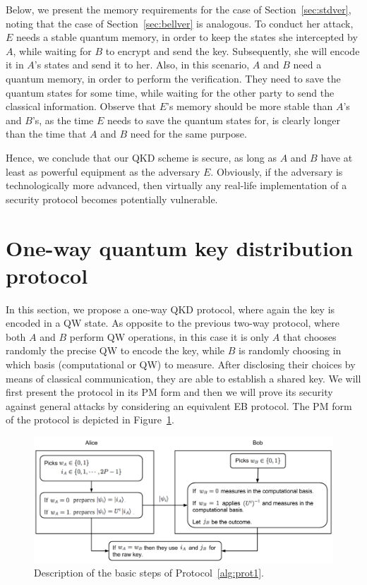 Below, we present the memory requirements for the case of Section~\ref{sec:stdver}, noting that the case of Section~\ref{sec:bellver} is analogous. To conduct her attack, $E$ needs a stable quantum memory, in order to keep the states she intercepted by $A$, while waiting for $B$ to encrypt and send the key. Subsequently, she will encode it in $A$'s states and send it to her. Also, in this scenario, $A$ and $B$ need a quantum memory, in order to perform the verification. They need to save the quantum states for some time, while waiting for the other party to send the classical information. Observe that $E$'s memory should be more stable than $A$'s and $B$'s, as the time $E$ needs to save the quantum states for, is clearly longer than the time that $A$ and $B$ need for the same purpose.

Hence, we conclude that our QKD scheme is  secure, as long as $A$ and $B$ have at least as powerful equipment as the adversary $E$. Obviously, if the adversary is technologically more advanced, then virtually any real-life implementation of a security protocol becomes potentially vulnerable.

\section{One-way quantum key distribution protocol}
\label{sec:oneway}
In this section, we propose a one-way QKD protocol, where again the key is encoded in a QW state.
As opposite to the previous two-way protocol, where both $A$ and $B$ perform QW operations, in this case it is only $A$ that chooses randomly the precise QW to encode the key, while $B$ is randomly choosing in which basis (computational or QW) to measure. After disclosing their choices by means of classical communication, they are able to establish a shared key. We will first present the protocol in its PM form and then we will prove its security against general attacks by considering an equivalent EB protocol. The PM form of the protocol is depicted in Figure~\ref{fig:prot1}.\\


\begin{center}
\begin{figure}[h!]
  \centering
  \includegraphics[width=\textwidth]{protocol_one-way.png}
\caption{Description of the basic steps of Protocol~\ref{alg:prot1}.}
\label{fig:prot1}
\end{figure}
\end{center}



